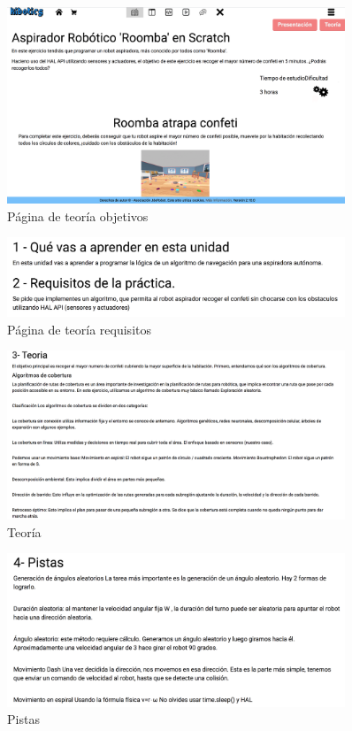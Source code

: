 \begin{figure}[H]
    \centering
    \includegraphics[width=0.9\textwidth, height=0.5\textwidth]{chapters/images/teoria1.png}
    \caption{Página de teoría objetivos}
    \label{fig:my_label}
\end{figure}
\begin{figure}[H]
    \centering
    \includegraphics[width=0.9\textwidth, height=0.2\textwidth]{chapters/images/teoria2.png}
    \caption{Página de teoría requisitos}
    \label{fig:my_label}
\end{figure}
\begin{figure}[H]
    \centering
    \includegraphics[width=0.9\textwidth, height=0.5\textwidth]{chapters/images/teoria2_2.png}
    \caption{Teoría}
    \label{fig:my_label}
\end{figure}
\begin{figure}[H]
    \centering
    \includegraphics[width=0.9\textwidth, height=0.45\textwidth]{chapters/images/teoria3.png}
    \caption{Pistas}
    \label{fig:my_label}
\end{figure}
